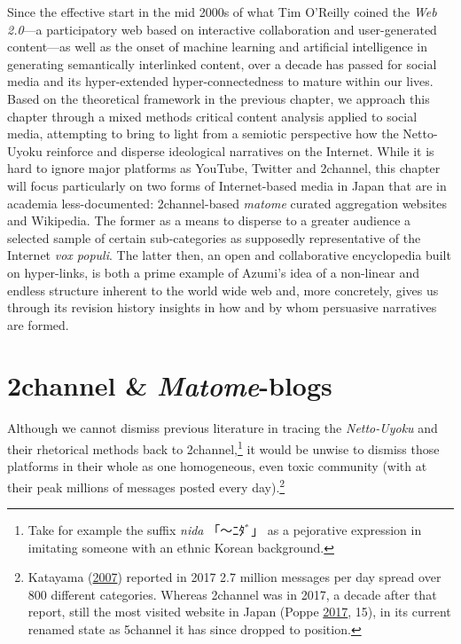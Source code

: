\documentclass[10pt,british,A4paper,twoside]{memoir}
\begin{document}
Since the effective start in the mid 2000s of what Tim O'Reilly coined
the \emph{Web 2.0}---a participatory web based on interactive
collaboration and user-generated content---as well as the onset of
machine learning and artificial intelligence in generating semantically
interlinked content, over a decade has passed for social media and its
hyper-extended hyper-connectedness to mature within our lives.
Based on the theoretical framework in the previous chapter, we approach
this chapter through a mixed methods critical content analysis applied
to social media, attempting to bring to light from a semiotic
perspective how the Netto-Uyoku reinforce and disperse ideological
narratives on the Internet. While it is hard to ignore major platforms
as YouTube, Twitter and 2channel, this chapter will focus particularly
on two forms of Internet-based media in Japan that are in academia
less-documented: 2channel-based \emph{matome} curated aggregation
websites and Wikipedia. The former as a means to disperse to a greater
audience a selected sample of certain sub-categories as supposedly
representative of the Internet \emph{vox populi}. The latter then, an
open and collaborative encyclopedia built on hyper-links, is both a
prime example of Azumi's idea of a non-linear and endless structure
inherent to the world wide web and, more concretely, gives us through
its revision history insights in how and by whom persuasive narratives
are formed.

\section{\texorpdfstring{2channel \&
\emph{Matome}-blogs}{2channel \& Matome-blogs}}\label{channel-matome-blogs}

Although we cannot dismiss previous literature in tracing the
\emph{Netto-Uyoku} and their rhetorical methods back to
2channel,\footnote{Take for example the suffix \emph{nida} 「～ﾆﾀﾞ」 as
  a pejorative expression in imitating someone with an ethnic Korean
  background.} it would be unwise to dismiss those platforms in their
whole as one homogeneous, even toxic community (with at their peak
millions of messages posted every day).\footnote{Katayama
  (\protect\hyperlink{ref-katayama_2-channel_2007}{2007}) reported in
  2017 2.7 million messages per day spread over 800 different
  categories. Whereas 2channel was in 2017, a decade after that report,
  still the  most visited website in Japan (Poppe
  \protect\hyperlink{ref-poppe_digitaal_2017}{2017}, 15), in its current
  renamed state as 5channel it has since dropped to  position.}
\end{document}
